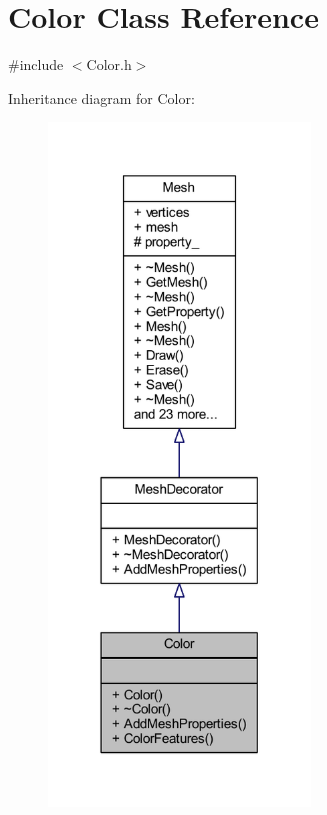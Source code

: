 \hypertarget{class_color}{}\section{Color Class Reference}
\label{class_color}


{\ttfamily \#include $<$Color.\+h$>$}



Inheritance diagram for Color\+:\nopagebreak
\begin{figure}[H]
\begin{center}
\leavevmode
\includegraphics[width=197pt]{class_color__inherit__graph}
\end{center}
\end{figure}



